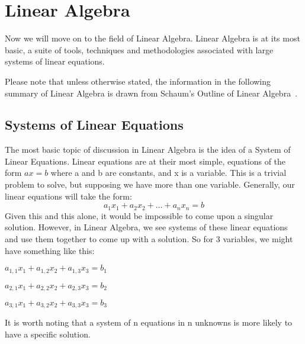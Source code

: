 
\section{Linear Algebra}  %

Now we will move on to the field of Linear Algebra. Linear Algebra is at its most basic, a suite of tools, techniques and methodologies associated with large systems of linear equations.\newline

Please note that unless otherwise stated, the information in the following summary of Linear Algebra is drawn from Schaum's Outline of Linear Algebra~\cite{Linear}.
\subsection{Systems of Linear Equations}
The most basic topic of discussion in Linear Algebra is the idea of a System of Linear Equations.
Linear equations are at their most simple, equations of the form $ax=b$ where a and b are constants, and x is a variable. This is a trivial problem to solve, but supposing we have more than one variable. Generally, our linear equations will take the form: $$a_{1}x_{1}+a_{2}x_{2}+...+a_{n}x_{n} = b$$
Given this and this alone, it would be impossible to come upon a singular solution. However, in Linear Algebra, we see systems of these linear equations and use them together to come up with a solution. So for 3 variables, we might have something like this:

\begin{center}
$a_{1,1}x_{1}+a_{1,2}x_{2}+a_{1,3}x_{3} = b_{1}$

$a_{2,1}x_{1}+a_{2,2}x_{2}+a_{2,3}x_{3} = b_{2}$

$a_{3,1}x_{1}+a_{3,2}x_{2}+a_{3,3}x_{3} = b_{3}$
\end{center}

\begin{theorem} It is worth noting that a system of n equations in n unknowns is more likely to have a specific solution.
\end{theorem}

